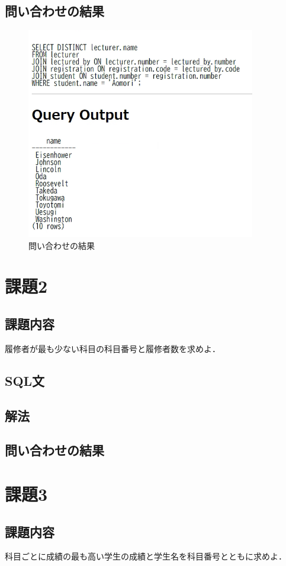\documentclass[dvipdfmx]{jarticle}
\begin{document}
\subsection{問い合わせの結果}
\begin{figure}[h]
    \centering
    \includegraphics[width = 10cm]{1.png}
    \caption{問い合わせの結果}
\end{figure}
\section{課題2}
\subsection{課題内容}
履修者が最も少ない科目の科目番号と履修者数を求めよ．
\subsection{SQL文}
\subsection{解法}
\subsection{問い合わせの結果}
\section{課題3}
\subsection{課題内容}
科目ごとに成績の最も高い学生の成績と学生名を科目番号とともに求めよ．
\end{document}
